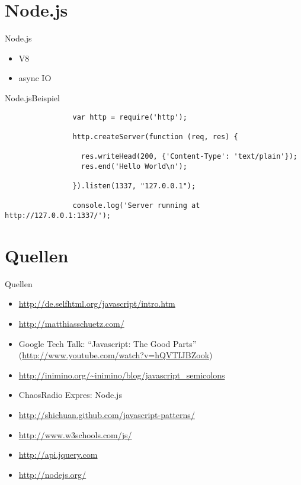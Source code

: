 \documentclass{beamer}
\begin{document}
	\section{Node.js}
		\begin{frame}[fragile, shrink=5]{Node.js}
			\begin{itemize}
				\item V8
				\item async IO
			\end{itemize}
		\end{frame}
		\begin{frame}[fragile, shrink=5]{Node.js}{Beispiel}
			\begin{lstlisting}
				var http = require('http');

				http.createServer(function (req, res) {

				  res.writeHead(200, {'Content-Type': 'text/plain'});
				  res.end('Hello World\n');

				}).listen(1337, "127.0.0.1");

				console.log('Server running at http://127.0.0.1:1337/');
			\end{lstlisting}
		\end{frame}

	\section*{Quellen}
		\begin{frame}[fragile, shrink=5]{Quellen}
			\begin{itemize}
				\item \url{http://de.selfhtml.org/javascript/intro.htm}
				\item \url{http://matthiasschuetz.com/}
				\item Google Tech Talk: "`Javascript: The Good Parts"'\\
					(\url{http://www.youtube.com/watch?v=hQVTIJBZook})
				\item \url{http://inimino.org/~inimino/blog/javascript_semicolons}
				\item ChaosRadio Expres: Node.js
				\item \url{http://shichuan.github.com/javascript-patterns/}
				\item \url{http://www.w3schools.com/js/}
				\item \url{http://api.jquery.com}
				\item \url{http://nodejs.org/}
			\end{itemize}
		\end{frame}
		
\end{document}
